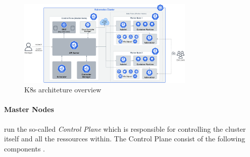 \documentclass[MSC,Master,english]{twbook}%
\begin{document}
\begin{figure}[ht]
    \centering
    \includegraphics[width=0.75\textwidth]{PICs/k8s-architecture.png}
    \caption{\ac{K8s} architeture overview \cite{pic-k8s-overview}}
    \label{fig:k8s-architecture}
\end{figure}

\paragraph{Master Nodes} run the so-called \textit{Control Plane} which is responsible for controlling the cluster itself and all the ressources within. The Control Plane consist of the following components \cite{k8scomp}.
\end{document}
